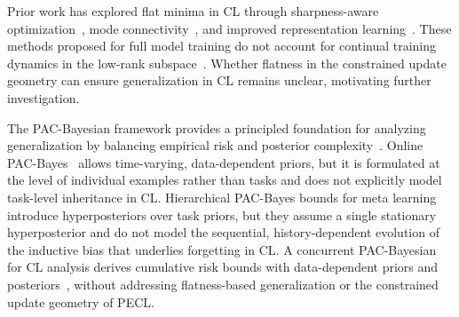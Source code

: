 \documentclass{article}
\newcommand{\minisection}[1]{\vspace{0.0in} \noindent {\bf #1}}
\begin{document}
\minisection{Flat Minima.}
Prior work has explored flat minima in CL through sharpness-aware optimization~\cite{pmlr-v151-bisla22a,Zhang_GAM,NEURIPS2024_C-Flat,yangRevisitingFlatnessAwareOptimization2025,chen2026sharpnessflatnessdecompositionframework}, mode connectivity~\cite{izmailov2019averagingweightsleadswider,mirzadeh2020linearmodeconnectivitymultitask}, and improved representation learning~\cite{hu2022doesselfsupervisedpretrainingperform,ramasesh2022effect}.
These methods proposed for full model training do not account for continual training dynamics in the low-rank subspace~\cite{yangRevisitingFlatnessAwareOptimization2025}. Whether flatness in the constrained update geometry can ensure generalization in CL remains unclear, motivating further investigation.


\minisection{PAC-Bayesian Theory.}
The PAC-Bayesian framework provides a principled foundation for analyzing generalization by balancing empirical risk and posterior complexity~\cite{mcallesterPACBayesianModelAveraging1999,mcallesterPACBayesianStochasticModel2003,germainPACBayesianTheoryMeets2016,lotfiPACBayesCompressionBounds2022}.
Online PAC-Bayes~\citep{NEURIPS2022_onlineBayes,NEURIPS2024_xinrui} allows time-varying, data-dependent priors, but it is formulated at the level of individual examples rather than tasks and does not explicitly model task-level inheritance in CL.
Hierarchical PAC-Bayes bounds for meta learning~\citep{pentinaPACBayesianBoundLifelong2014,JMLR:v24:22-1254} introduce hyperposteriors over task priors, but they assume a single stationary hyperposterior and do not model the sequential, history-dependent evolution of the inductive bias that underlies forgetting in CL. A concurrent PAC-Bayesian for CL analysis derives cumulative risk bounds with data-dependent priors and posteriors~\cite{friedman2026pac}, without addressing flatness-based generalization or the constrained update geometry of PECL.
\end{document}

